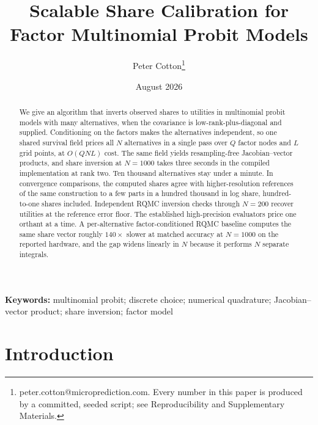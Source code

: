 \documentclass[12pt]{article}
\title{Scalable Share Calibration for\\ Factor Multinomial Probit Models}
\author{Peter Cotton\thanks{peter.cotton@microprediction.com. Every
number in this paper is produced by a committed, seeded script; see
Reproducibility and Supplementary Materials.}}
\date{August 2026}
\theoremstyle{remark}
\begin{document}
\maketitle

\begin{abstract}
We give an algorithm that inverts observed shares to utilities in
multinomial probit models with many alternatives, when the covariance
is low-rank-plus-diagonal and supplied. Conditioning on the factors
makes the alternatives independent, so one shared survival field prices
all $N$ alternatives in a single pass over $Q$ factor nodes and $L$
grid points, at $O(QNL)$ cost. The same field yields resampling-free
Jacobian--vector products, and share inversion at $N = 1000$ takes
three seconds in the compiled implementation at rank two. Ten thousand
alternatives stay under a minute. In convergence comparisons, the
computed shares agree with higher-resolution references of the same
construction to a few parts in a hundred thousand in log share,
hundred-to-one shares included. Independent
RQMC inversion checks through $N = 200$ recover utilities at the
reference error floor. The established high-precision evaluators price
one orthant at a time. A per-alternative factor-conditioned RQMC
baseline computes the same share vector roughly $140\times$ slower at
matched accuracy at $N = 1000$ on the reported hardware, and the gap
widens linearly in $N$ because it performs $N$ separate integrals.
\end{abstract}

\noindent\textbf{Keywords:} multinomial probit; discrete choice;
numerical quadrature; Jacobian--vector product; share inversion; factor
model

\section{Introduction}
\end{document}
